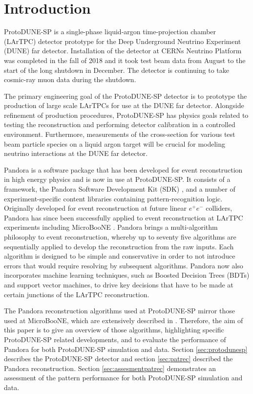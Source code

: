 \section{Introduction}
\label{sec:intro}
ProtoDUNE-SP is a single-phase liquid-argon time-projection chamber (LArTPC) detector prototype for the Deep Underground Neutrino Experiment (DUNE) far detector.  Installation of the detector at CERNs Neutrino Platform was completed in the fall of 2018 and it took test beam data from August to the start of the long shutdown in December.  The detector is continuing to take cosmic-ray muon data during the shutdown.  

The primary engineering goal of the ProtoDUNE-SP detector is to prototype the production of large scale LArTPCs for use at the DUNE far detector.  Alongside refinement of production procedures, ProtoDUNE-SP has physics goals related to testing the reconstruction and performing detector calibration in a controlled environment.  Furthermore, measurements of the cross-section for various test beam particle species on a liquid argon target will be crucial for modeling neutrino interactions at the DUNE far detector.

Pandora is a software package that has been developed for event reconstruction in high energy physics and is now in use at ProtoDUNE-SP.  It consists of a framework, the Pandora Software Development Kit (SDK) \cite{pandorasdk}, and a number of experiment-specific content libraries containing pattern-recognition logic.  Originally developed for event reconstruction at future linear $e^{+}e^{-}$ colliders, Pandora has since been successfully applied to event reconstruction at LArTPC experiments including MicroBooNE \cite{pandorauboone}.  Pandora brings a multi-algorithm philosophy to event reconstruction, whereby up to seventy five algorithms are sequentially applied to develop the reconstruction from the raw inputs.  Each algorithm is designed to be simple and conservative in order to not introduce errors that would require resolving by subsequent algorithms.  Pandora now also incorporates machine learning techniques, such as Boosted Decision Trees (BDTs) and support vector machines, to drive key decisions that have to be made at certain junctions of the LArTPC reconstruction. 

The Pandora reconstruction algorithms used at ProtoDUNE-SP mirror those used at MicroBooNE, which are extensively described in \cite{pandorauboone}.  Therefore, the aim of this paper is to give an overview of those algorithms, highlighting specific ProtoDUNE-SP related developments, and to evaluate the performance of Pandora for both ProtoDUNE-SP simulation and data.  Section \ref{sec:protodunesp} describes the ProtoDUNE-SP detector and section \ref{sec:patrec} described the Pandora reconstruction.  Section \ref{sec:assesmentpatrec} demonstrates an assessment of the pattern performance for both ProtoDUNE-SP simulation and data.  

